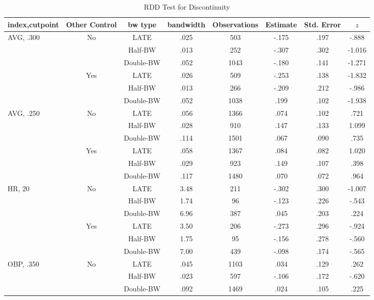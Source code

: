 \documentclass[dvipdfmx, 12pt]{article}
\begin{document}
\begin{table}[!]
  \caption{RDD Test for Discontinuity}
  \label{RDD_A}
  \tiny
  \centering
  \begin{tabular}{lccccccc}\hline
    index,cutpoint & Other Control & bw type & bandwidth
    & Observations & Estimate & Std. Error & $z$
    \\ \hline \hline
    AVG, .300 & No &LATE & .025 & 503 & -.175 & .197 & -.888 \\
    & &Half-BW &  .013 & 252 & -.307 & .302 & -1.016 \\
    & & Double-BW & .052 & 1043  & -.180 & .141 & -1.271 \\ \cline{3-8}

    & Yes &LATE & .026 & 509 & -.253 & .138 & -1.832 \\
    & &Half-BW &  .013 & 266 & -.209 & .212 & -.986 \\
    & & Double-BW & .052 & 1038  & .199 & .102 & -1.938 \\ \hline

    AVG, .250 & No &LATE & .056 & 1366 & .074 & .102 & .721 \\
    & &Half-BW & .028 & 910 & .147 & .133 & 1.099 \\
    & & Double-BW & .114 & 1501  & .067 & .090 & .735 \\ \cline{3-8}

    & Yes &LATE & .058 & 1367 & .084 & .082 & 1.020 \\
    & &Half-BW & .029 & 923 & .149 & .107 & .398 \\
    & & Double-BW & .117 & 1480  & .070 & .072 & .964 \\ \hline

    HR, 20 & No & LATE & 3.48 & 211 & -.302 & .300 & -1.007 \\
    & & Half-BW & 1.74 & 96 & -.123 & .226 & -.543 \\
    & & Double-BW & 6.96 & 387 & .045 & .203 & .224 \\ \cline{3-8}

    & Yes & LATE & 3.50  & 206 & -.273 & .296 & -.924\\
    & & Half-BW & 1.75 & 95 & -.156 & .278 & -.560 \\
    & & Double-BW & 7.00 & 439 & -.098 & .174 & -.565 \\ \hline

    OBP, .350 & No &LATE & .045 & 1103 & .034 & .129 & .262 \\
    & & Half-BW & .023 & 597 & -.106 & .172 & -.620 \\
    & & Double-BW & .092 & 1469 & .024 & .105 & .225 \\ \cline{3-8}


\end{tabular}
\end{table}
\end{document}
